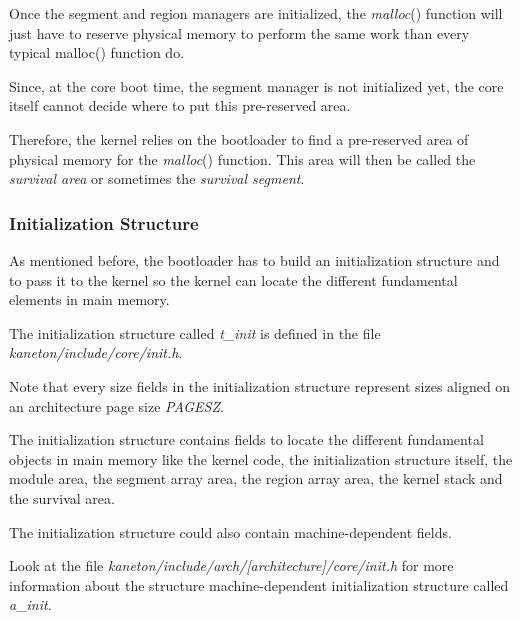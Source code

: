 Once the segment and region managers are initialized, the
\textit{malloc}() function will just have to reserve physical memory to
perform the same work than every typical malloc() function do.

Since, at the core boot time, the segment manager is not initialized yet,
the core itself cannot decide where to put this pre-reserved area.

Therefore, the kernel relies on the bootloader to find a pre-reserved
area of physical memory for the \textit{malloc}() function. This area will
then be called the \textit{survival area} or sometimes the
\textit{survival segment}.

%
%

\subsubsection{Initialization Structure}

As mentioned before, the bootloader has to build an initialization structure
and to pass it to the kernel so the kernel can locate the different
fundamental elements in main memory.

The initialization structure called \textit{t\_init} is defined in the
file \textit{kaneton/include/core/init.h}.

Note that every size fields in the initialization structure represent
sizes aligned on an architecture page size \textit{PAGESZ}.

The initialization structure contains fields to locate the different
fundamental objects in main memory like the kernel code,
the initialization structure itself, the module area, the segment
array area, the region array area, the kernel stack and the survival
area.

The initialization structure could also contain machine-dependent fields.

Look at the file \textit{kaneton/include/arch/[architecture]/core/init.h}
for more information about the structure machine-dependent initialization
structure called \textit{a\_init}.

